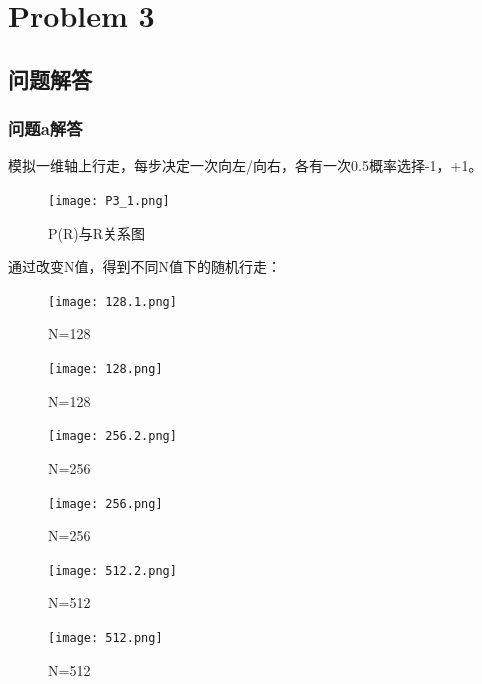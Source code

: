 \documentclass[12pt,a4paper]{article}%
\begin{document}
\section{Problem 3}
\subsection{问题解答}
\subsubsection{问题a解答}
模拟一维轴上行走，每步决定一次向左/向右，各有一次0.5概率选择-1，+1。
\begin{figure}[htbp]
    \centering
    \texttt{[image: P3\_1.png]}\label{fig:figure4}
    \caption{P(R)与R关系图}
\end{figure}

通过改变N值，得到不同N值下的随机行走：

\begin{figure}[H]%
    \centering
    \begin{minipage}{0.48\textwidth}
        \centering
        \texttt{[image: 128.1.png]}
        \caption{\fontsize{10pt}{15pt}\selectfont N=128}
    \end{minipage}
    \hspace{0cm}%
    \hfill%
    \begin{minipage}{0.48\textwidth}
        \centering
        \texttt{[image: 128.png]}
        \caption{\fontsize{10pt}{15pt}\selectfont N=128}
    \end{minipage}\label{fig:figure3}
\end{figure}

\begin{figure}[H]%
    \centering
    \begin{minipage}{0.48\textwidth}
        \centering
        \texttt{[image: 256.2.png]}
        \caption{\fontsize{10pt}{15pt}\selectfont N=256}
    \end{minipage}
    \hspace{0cm}%
    \hfill%
    \begin{minipage}{0.48\textwidth}
        \centering
        \texttt{[image: 256.png]}
        \caption{\fontsize{10pt}{15pt}\selectfont N=256}
    \end{minipage}\label{fig:figure3}
\end{figure}

\begin{figure}[H]%
    \centering
    \begin{minipage}{0.48\textwidth}
        \centering
        \texttt{[image: 512.2.png]}
        \caption{\fontsize{10pt}{15pt}\selectfont N=512}
    \end{minipage}
    \hspace{0cm}%
    \hfill%
    \begin{minipage}{0.48\textwidth}
        \centering
        \texttt{[image: 512.png]}
        \caption{\fontsize{10pt}{15pt}\selectfont N=512}
    \end{minipage}\label{fig:figure3}
\end{figure}
\end{document}
